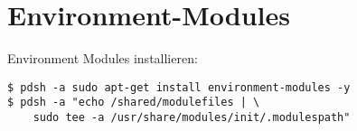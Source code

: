 \chapter{Environment-Modules}
Environment Modules installieren:
\begin{lstlisting}[style=Bash]
$ pdsh -a sudo apt-get install environment-modules -y
$ pdsh -a "echo /shared/modulefiles | \
	sudo tee -a /usr/share/modules/init/.modulespath"
\end{lstlisting}
